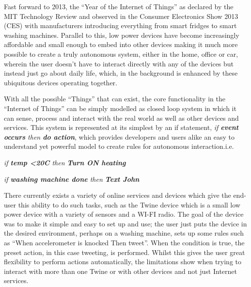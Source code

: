 Fast forward to 2013, the ``Year of the Internet of Things'' as declared by the MIT Technology Review\cite{2013IoT} and observed in the Consumer Electronics Show 2013 (CES) with manufacturers introducing everything from smart fridges to smart washing machines. Parallel to this, low power devices have become increasingly affordable and small enough to embed into other devices making it much more possible to create a truly autonomous system, either in the home, office or car, wherein the user doesn't have to interact directly with any of the devices but instead just go about daily life, which, in the background is enhanced by these ubiquitous devices operating together.

With all the possible ``Things'' that can exist, the core functionality in the ``Internet of Things'' can be simply modelled as closed loop system in which it can sense, process and interact with the real world as well as other devices and services. This system is represented at its simplest by an if statement, \textit{if \textbf{event occurs} then \textbf{do action}}, which provides developers and users alike an easy to understand yet powerful model to create rules for autonomous interaction.i.e.
\begin{center}
	\textit{if \textbf{temp \textless  20C} then \textbf{Turn ON heating}}

	\textit{if \textbf{washing machine done} then \textbf{Text John}}
\end{center}

There currently exists a variety of online services and devices which give the end-user this ability to do such tasks, such as the Twine device \cite{Twine} which is a small low power device with a variety of sensors and a WI-FI radio. The goal of the device was to make it simple and easy to set up and use; the user just puts the device in the desired environment, perhaps on a washing machine, sets up some rules such as ``When accelerometer is knocked Then tweet''. When the condition is true, the preset action, in this case tweeting, is performed. Whilst this gives the user great flexibility to perform actions automatically, the limitations show when trying to interact with more than one Twine or with other devices and not just Internet services. 

